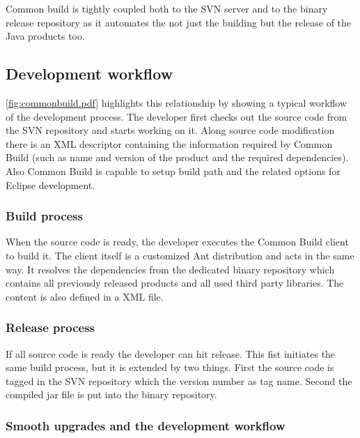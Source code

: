 Common build is tightly coupled both to the SVN server and to the binary release
repository as it automates the not just the building but the release of the
Java products too.

\subsection{Development workflow}
\autoref{fig:commonbuild.pdf} highlights this relationship by showing a typical
workflow of the development process. The developer first checks out the source
code from the SVN repository and starts working on it. Along source code
modification there is an XML descriptor containing the information required by
Common Build (such as name and version of the product and the required
dependencies). Also Common Build is capable to setup build path and the related
options for Eclipse development. 

\subsubsection{Build process}
When the source code is ready, the developer executes the Common Build client to
build it. The client itself is a customized Ant distribution and acts in the
same way. It resolves the dependencies from the dedicated binary repository
which contains all previously released products and all used third party
libraries. The content is also defined in a XML file.

\subsubsection{Release process}
If all source code is ready the developer can hit release. This fist initiates
the same build process, but it is extended by two things. First the source code
is tagged in the SVN repository which the version number as tag name. Second the
compiled jar file is put into the binary repository. 

\subsubsection{Smooth upgrades and the development workflow}




